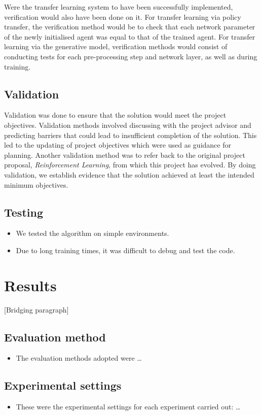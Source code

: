 \documentclass[12pt,a4paper]{article}
\begin{document}
Were the transfer learning system to have been successfully implemented, verification would also have been done on it. For transfer learning via policy transfer, the verification method would be to check that each network parameter of the newly initialised agent was equal to that of the trained agent. For transfer learning via the generative model, verification methods would consist of conducting tests for each pre-processing step and network layer, as well as during training.

\subsection{Validation}
Validation was done to ensure that the solution would meet the project objectives. Validation methods involved discussing with the project advisor and predicting barriers that could lead to insufficient completion of the solution. This led to the updating of project objectives which were used as guidance for planning. Another validation method was to refer back to the original project proposal, \textit{Reinforcement Learning}, from which this project has evolved. By doing validation, we establish evidence that the solution achieved at least the intended minimum objectives.  

\subsection{Testing}
\begin{itemize}
    \item We tested the algorithm on simple environments. 
    \item Due to long training times, it was difficult to debug and test the code. 
\end{itemize}

\newpage
\section{Results}
[Bridging paragraph]
\subsection{Evaluation method}
\begin{itemize}
    \item The evaluation methods adopted were \dots
\end{itemize}

\subsection{Experimental settings}
\begin{itemize}
    \item These were the experimental settings for each experiment carried out: \dots
\end{itemize}
\end{document}
